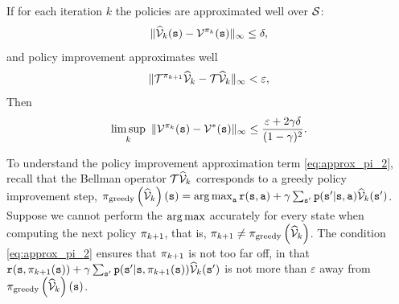 \begin{theorem}\label{thm:API}
If for each iteration $k$ the policies are approximated well over $\mathcal{S}$:
\begin{equation}\label{eq:approx_pi_1}
\|\widehat{\mathcal{V}}_k({\tt s})-\mathcal{V}^{\pi_k}({\tt s})\|_\infty \le \delta,
\end{equation}
and policy improvement approximates well
\begin{equation}\label{eq:approx_pi_2}
\|\mathcal{T}^{\pi_{k+1}}\widehat{\mathcal{V}}_k - \mathcal{T}\widehat{\mathcal{V}}_k\|_\infty < \varepsilon,
\end{equation}
Then
$$ \limsup_k \ \| \mathcal{V}^{\pi_k}({\tt s})-\mathcal{V}^*({\tt s})\|_\infty \le \frac{\varepsilon+2\gamma\delta}{(1-\gamma)^2}.$$
\end{theorem}
\sloppy To understand the policy improvement approximation term \eqref{eq:approx_pi_2}, recall that the Bellman operator $\mathcal{T}\widehat{\mathcal{V}}_k$ corresponds to a greedy policy improvement step, $\policy_{\textrm{greedy}}\left(\widehat{\Value}_k\right)(\state) = \argmax_{\action} \reward(\state,\action) + \discount \sum_{\state'} \transitionprob(\state'|\state,\action)\widehat{\Value}_k(\state')$. Suppose we cannot perform the $\argmax$ accurately for every state when computing the next policy $\pi_{k+1}$, that is, $\pi_{k+1} \neq \pi_{\textrm{greedy}}\left(\widehat{\mathcal{V}}_k\right)$. The condition \eqref{eq:approx_pi_2} ensures that $\pi_{k+1}$ is not too far off, in that ${\tt r}({\tt s},\pi_{k+1}({\tt s})) + \gamma \sum_{{\tt s}'} {\tt p}({\tt s}'|{\tt s},\pi_{k+1}({\tt s}))\widehat{\mathcal{V}}_k({\tt s}')$ is not more than $\varepsilon$ away from $\pi_{\textrm{greedy}}\left(\widehat{\mathcal{V}}_k\right)({\tt s})$.
